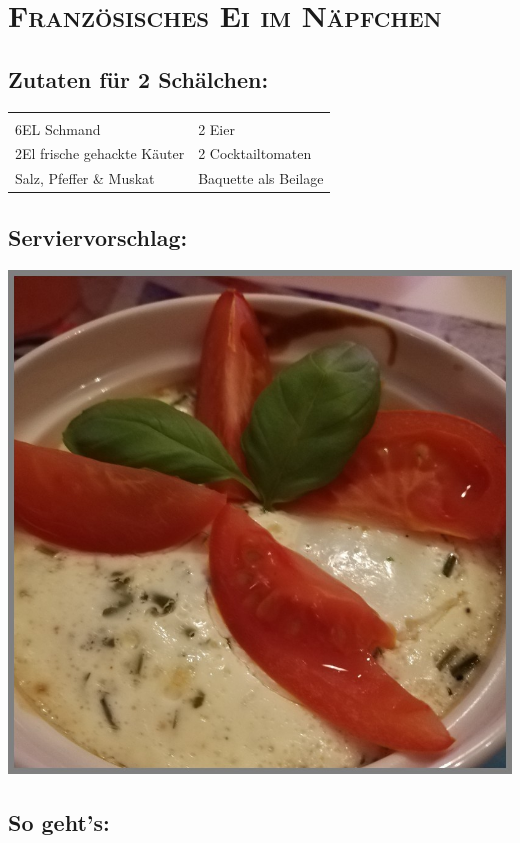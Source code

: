\section{\textsc{Französisches Ei im Näpfchen}}

\subsection*{Zutaten für 2 Schälchen:}

\begin{tabular}{p{7.5cm} p{7.5cm}}
	& \\
	6EL Schmand & 2 Eier \\
	2El frische gehackte Käuter & 2 Cocktailtomaten \\
  Salz, Pfeffer \& Muskat & Baquette als Beilage
\end{tabular}

\subsection*{Serviervorschlag:}

\includegraphics[width=\textwidth]{img/ei_naepfchen.jpg} \cite{eiimnaepfchen}

\subsection*{So geht's:}

